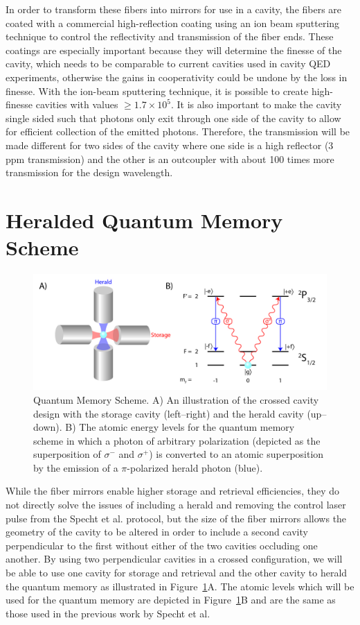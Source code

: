 \documentclass[a4paper]{article}
\begin{document}
In order to transform these fibers into mirrors for use in a cavity, the fibers are coated with a commercial high-reflection coating using an ion beam sputtering technique to control the reflectivity and transmission of the fiber ends. These coatings are especially important because they will determine the finesse of the cavity, which needs to be comparable to current cavities used in cavity QED experiments, otherwise the gains in cooperativity could be undone by the loss in finesse. With the ion-beam sputtering technique, it is possible to create high-finesse cavities with values $\geq 1.7\times10^5$.  It is also important to make the cavity single sided such that photons only exit through one side of the cavity to allow for efficient collection of the emitted photons. Therefore, the transmission will be made different for two sides of the cavity where one side is a high reflector (3 ppm transmission) and the other is an outcoupler with about 100 times more transmission for the design wavelength.


\section{Heralded Quantum Memory Scheme}

\begin{figure}
\centering
\includegraphics[width=1\textwidth]{Fig_1_Quantum_Memory_Scheme_v2-01.jpg}
\caption{\label{fig:quantumScheme} Quantum Memory Scheme. A) An illustration of the crossed cavity design with the storage cavity (left--right) and the herald cavity (up--down). B) The atomic energy levels for the quantum memory scheme in which a photon of arbitrary polarization (depicted as the superposition of $\sigma^-$ and $\sigma ^+$) is converted to an atomic superposition by the emission of a $\pi$-polarized herald photon (blue).}
\end{figure}

\indent\indent While the fiber mirrors enable higher storage and retrieval efficiencies, they do not directly solve the issues of including a herald and removing the control laser pulse from the Specht et al. protocol, but the size of the fiber mirrors allows the geometry of the cavity to be altered in order to include a second cavity perpendicular to the first without either of the two cavities occluding one another. By using two perpendicular cavities in a crossed configuration, we will be able to use one cavity for storage and retrieval and the other cavity to herald the quantum memory as illustrated in Figure~\ref{fig:quantumScheme}A. The atomic levels which will be used for the quantum memory are depicted in Figure~\ref{fig:quantumScheme}B and are the same as  those used in the previous work by Specht et al.
\end{document}
